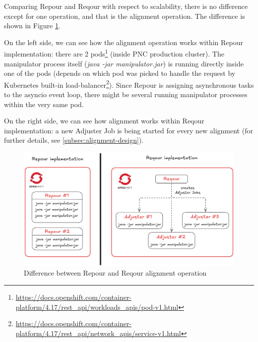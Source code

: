 \documentclass[../main.tex]{subfiles}
\begin{document}
Comparing Repour and Reqour with respect to scalability, there is no difference except for one operation, and that is the alignment operation. The difference is shown in Figure \ref{fig:scalability}.

On the left side, we can see how the alignment operation works within Repour implementation: there are 2 pods\footnote{\url{https://docs.openshift.com/container-platform/4.17/rest_api/workloads_apis/pod-v1.html}} (inside PNC production cluster). The manipulator process itself (\textit{java -jar manipulator.jar}) is running directly inside one of the pods (depends on which pod was picked to handle the request by Kubernetes built-in load-balancer\footnote{\url{https://docs.openshift.com/container-platform/4.17/rest_api/network_apis/service-v1.html}}). Since Repour is assigning asynchronous tasks to the asyncio event loop, there might be several running manipulator processes within the very same pod.

On the right side, we can see how alignment works within Reqour implementation: a new Adjuster Job is being started for every new alignment (for further details, see \ref{subsec:alignment-design}).

\begin{figure}
  \begin{center}
    \includegraphics[width=\textwidth]{images/scalability.png}
  \end{center}
  \caption{Difference between Repour and Reqour alignment operation}
  \label{fig:scalability}
\end{figure}
\end{document}
